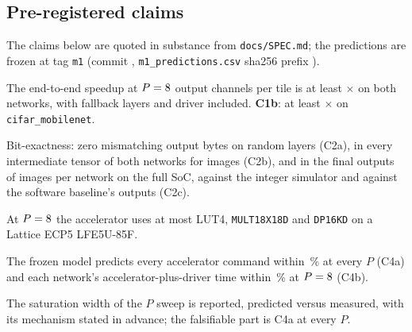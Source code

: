 \documentclass[journal]{IEEEtran}
\begin{document}
\subsection{Pre-registered claims}
The claims below are quoted in substance from \texttt{docs/SPEC.md}; the predictions are frozen at tag \texttt{m1} (commit \texttt{\MOneCommitShort}, \texttt{m1\_predictions.csv} sha256 prefix \texttt{\MOneCsvShaShort}).
\begin{description}\setlength{\itemsep}{1pt}
\item[C1] The end-to-end speedup at $P=8$ output channels per tile is at least \ThreshCone$\times$ on both networks, with fallback layers and driver included. \textbf{C1b}: at least \ThreshConeB$\times$ on \texttt{cifar\_mobilenet}.
\item[C2] Bit-exactness: zero mismatching output bytes on \RandomLayers{} random layers (C2a), in every intermediate tensor of both networks for \ImagesCtwoB{} images (C2b), and in the final outputs of \ImagesCtwoC{} images per network on the full SoC, against the integer simulator and against the software baseline's outputs (C2c).
\item[C3] At $P=8$ the accelerator uses at most \BudgetLut{} LUT4, \BudgetMult{} \texttt{MULT18X18D} and \BudgetBram{} \texttt{DP16KD} on a Lattice ECP5 LFE5U-85F.
\item[C4] The frozen model predicts every accelerator command within \ThreshFourA\,\% at every $P$ (C4a) and each network's accelerator-plus-driver time within \ThreshFourB\,\% at $P=8$ (C4b).
\item[C5] The saturation width of the $P$ sweep is reported, predicted versus measured, with its mechanism stated in advance; the falsifiable part is C4a at every $P$.
\end{description}
\end{document}
